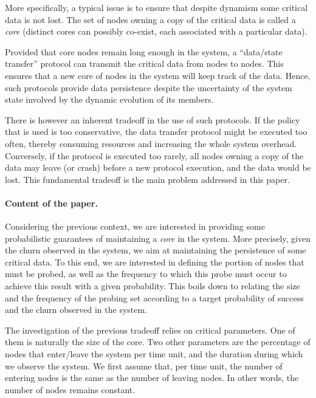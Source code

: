 \documentclass[]{llncs}
\begin{document}
More  specifically, a typical issue is to ensure that despite dynamism 
some critical data is not lost.
The set of nodes owning a copy of the critical data is called a {\it core}
(distinct cores can possibly co-exist, each associated with a particular
data).   

Provided that core nodes remain long enough in the system, 
a ``data/state  transfer'' protocol can transmit the critical data from nodes to nodes.
This ensures that a new core of nodes in the system will 
keep track of the data.
Hence, such protocols provide data persistence despite the uncertainty of the system state
involved by the dynamic evolution of its members. 


There is however an inherent tradeoff in the use of such protocols.  
If the policy that is used is too  conservative, 
the data transfer protocol might be executed too often, thereby consuming
resources and increasing the whole system overhead. 
Conversely, if the protocol is executed too rarely, 
all nodes owning a copy of the data may leave (or crash) before  
a new protocol execution, and the data would be lost.
This fundamental tradeoff is the main problem addressed in 
this paper. 


\paragraph{Content of the paper.}
Considering the previous context, we are interested in providing some 
probabilistic guarantees of maintaining a \textit{core} in the system.
More precisely, given the churn observed in the system, we aim at 
maintaining the persistence of some critical data.
To this end, we are interested in defining the portion of nodes 
that must be probed, as well as the frequency to which this probe must 
occur to achieve this result with a given probability.
This boils down to relating the size and the frequency of the probing set
according to a target probability of success and the churn observed in the
system. 

The investigation of the previous tradeoff relies on  critical
parameters. One of them is naturally the size of the core. Two other parameters are the percentage of nodes that enter/leave the
system per time unit, and the duration during which we observe the system.  We first assume that, per time unit,
the number of entering nodes is the same as the number of leaving
nodes. In other words, the number of nodes remains constant.
\end{document}
